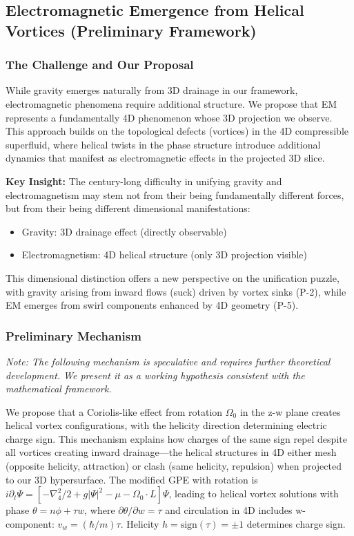 \subsection{Electromagnetic Emergence from Helical Vortices (Preliminary Framework)}

\subsubsection{The Challenge and Our Proposal}
While gravity emerges naturally from 3D drainage in our framework, electromagnetic phenomena require additional structure. We propose that EM represents a fundamentally 4D phenomenon whose 3D projection we observe. This approach builds on the topological defects (vortices) in the 4D compressible superfluid, where helical twists in the phase structure introduce additional dynamics that manifest as electromagnetic effects in the projected 3D slice.

\textbf{Key Insight:} The century-long difficulty in unifying gravity and electromagnetism may stem not from their being fundamentally different forces, but from their being different dimensional manifestations:
\begin{itemize}
\item Gravity: 3D drainage effect (directly observable)
\item Electromagnetism: 4D helical structure (only 3D projection visible)
\end{itemize}
This dimensional distinction offers a new perspective on the unification puzzle, with gravity arising from inward flows (suck) driven by vortex sinks (P-2), while EM emerges from swirl components enhanced by 4D geometry (P-5).

\subsubsection{Preliminary Mechanism}
\textit{Note: The following mechanism is speculative and requires further theoretical development. We present it as a working hypothesis consistent with the mathematical framework.}

We propose that a Coriolis-like effect from rotation $\Omega_0$ in the z-w plane creates helical vortex configurations, with the helicity direction determining electric charge sign. This mechanism explains how charges of the same sign repel despite all vortices creating inward drainage—the helical structures in 4D either mesh (opposite helicity, attraction) or clash (same helicity, repulsion) when projected to our 3D hypersurface. The modified GPE with rotation is $i\partial_t\Psi = [-\nabla_4^2/2 + g|\Psi|^2 - \mu - \Omega_0\cdot L]\Psi$, leading to helical vortex solutions with phase $\theta = n\phi + \tau w$, where $\partial\theta/\partial w = \tau$ and circulation in 4D includes w-component: $v_w = (\hbar/m)\tau$. Helicity $h = \text{sign}(\tau) = \pm1$ determines charge sign.

